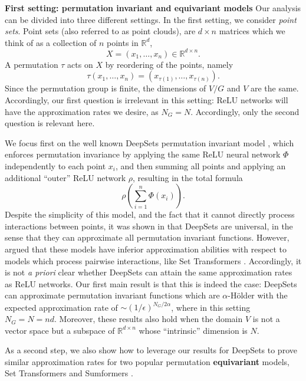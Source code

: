 \documentclass[twoside,11pt]{article}
\newcommand{\RR}{\mathbb{R}}
\begin{document}
\textbf{First setting: permutation invariant and equivariant models} Our analysis can be divided into three different settings. In the first setting, we consider  \textit{point sets}. Point sets (also referred to as point clouds), are $d\times n$ matrices which we think of as a collection of $n$ points in $\RR^d$,  
 $$X=(x_1,\ldots,x_n)\in \RR^{d\times n}.$$
 A permutation $\tau$ acts on  $X$ by reordering of the points, namely
	$$\tau\left(x_1,\ldots,x_n \right)=\left(x_{\tau(1)},
	\ldots, x_{\tau(n)} \right) .$$
Since the permutation group is finite, the dimensions of $V/G$ and $V$ are the same. Accordingly, our first question is irrelevant in this setting: ReLU networks will have the approximation rates we desire, as $N_G=N $. Accordingly, only the second question is relevant here. 

We focus first on the well known DeepSets permutation invariant model \citep{zaheer2017deep}, which enforces permutation invariance by applying the same ReLU neural network $\Phi $ independently to each point $x_i$, and then summing all points and applying an additional ``outer'' ReLU network $\rho$, resulting in the total formula
\begin{equation*}
	\rho\left(\sum_{i=1}^n\Phi(x_i)\right).
\end{equation*}  
Despite the simplicity of this model, and the fact that it cannot directly process interactions between points,  it was shown in \cite{zaheer2017deep} that DeepSets are universal, in the sense that they can approximate all permutation invariant functions. However, \cite{zweig2022exponential} argued that these models have inferior approximation abilities with respect to models which process pairwise interactions, like Set Transformers \citep{lee2019set}. Accordingly, it is not \emph{a priori} clear whether DeepSets can attain the same approximation rates as ReLU networks. Our first main result is that this is indeed the case: DeepSets can approximate permutation invariant functions which are $\alpha$-H\"older with the expected  approximation rate of $\sim (1/\epsilon)^{N_G/2\alpha} $, where in this setting $N_G=N=nd $. Moreover, these results also hold when the  domain $V$ is not a vector space but a subspace of $\RR^{d\times n}$ whose ``intrinsic'' dimension is $N$. 

As a second step, we also show how to leverage our results for DeepSets to prove similar approximation rates for two popular permutation \textbf{equivariant} models, Set Transformers \citep{lee2019set} and Sumformers \citep{Sumformer,segoluniversal}.
\end{document}
